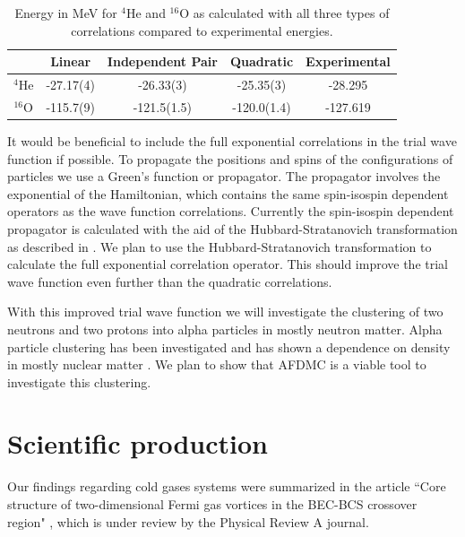 \documentclass[12pt,letterpaper]{article}
\begin{document}
\begin{table}[h!]
   \centering
   \caption{Energy in MeV for $^4$He and $^{16}$O as calculated with all three types of correlations compared to experimental energies.}
   \label{tab:indpairresults}
   \begin{tabular}{ccccc}
      \hline \hline
       & Linear & Independent Pair & Quadratic & Experimental\\
      \hline
      $^4$He & -27.17(4) & -26.33(3) & -25.35(3) & -28.295\\
      $^{16}$O & -115.7(9) & -121.5(1.5) & -120.0(1.4) & -127.619\\
      \hline \hline
   \end{tabular}
\end{table}

It would be beneficial to include the full exponential correlations in the 
trial wave function if possible. To propagate the positions and spins of the 
configurations of particles we use a Green's function or propagator. The 
propagator involves the exponential of the Hamiltonian, which contains the same 
spin-isospin dependent operators as the wave function correlations. Currently 
the spin-isospin dependent propagator is calculated with the aid of the 
Hubbard-Stratanovich transformation as described in \cite{car15}. We plan to 
use the Hubbard-Stratanovich transformation to calculate the full exponential 
correlation operator. This should improve the trial wave function even further 
than the quadratic correlations.

With this improved trial wave function we will investigate the clustering of 
two neutrons and two protons into alpha particles in mostly neutron matter. 
Alpha particle clustering has been investigated and has shown a dependence on 
density in mostly nuclear matter \cite{sch13}. We plan to show that AFDMC is a 
viable tool to investigate this clustering.
\vspace{-0.5cm}
\section{Scientific production}
Our findings regarding cold gases systems were summarized in the article
``Core structure of two-dimensional Fermi gas vortices
in the BEC-BCS crossover region" \cite{mad17}, which is under review by the 
Physical 
Review A journal.

\vspace{-0.5cm}


\end{document}

